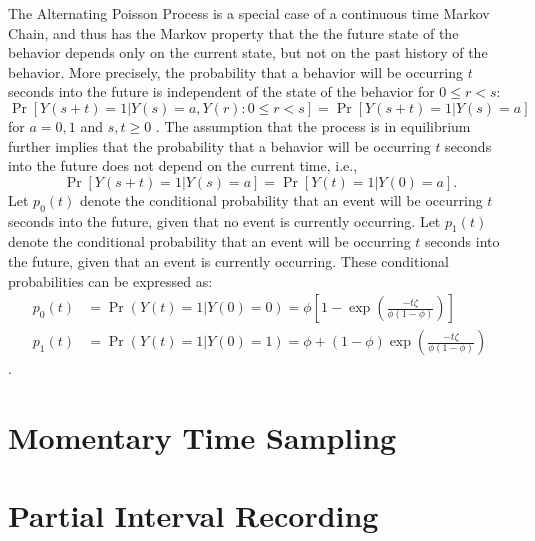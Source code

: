 \documentclass[man, noextraspace, floatsintext]{apa6}\usepackage[]{graphicx}\usepackage[]{color}
\begin{document}
The Alternating Poisson Process is a special case of a continuous time Markov Chain, and thus has the Markov property that the the future state of the behavior depends only on the current state, but not on the past history of the behavior. More precisely, the probability that a behavior will be occurring $t$ seconds into the future is independent of the state of the behavior for $0 \leq r < s$: 
\begin{equation}
\label{eq:Markov}
\Pr\left[Y(s + t) = 1 \left| Y(s) = a, Y(r): 0 \leq r < s \right.\right] = \Pr\left[ Y(s + t) = 1 \left| Y(s) = a \right.\right]
\end{equation}
for $a = 0,1$ and $s,t \geq 0$ \citep[Thm. 6.1]{Kulkarni2010modeling}. The assumption that the process is in equilibrium further implies that the probability that a behavior will be occurring $t$ seconds into the future does not depend on the current time, i.e.,  
\begin{equation}
\label{eq:equilibrium}
\Pr\left[Y(s + t) = 1 \left| Y(s) = a\right.\right] = \Pr\left[ Y(t) = 1 \left| Y(0) = a \right.\right].
\end{equation}
Let $p_0(t)$ denote the conditional probability that an event will be occurring $t$ seconds into the future, given that no event is currently occurring. Let $p_1(t)$ denote the conditional probability that an event will be occurring $t$ seconds into the future, given that an event is currently occurring. These conditional probabilities can be expressed as:
\begin{equation}
\begin{aligned}
p_0(t) &= \Pr(Y(t) = 1 | Y(0) = 0) = \phi \left[1 - \exp\left(\frac{- t \zeta}{\phi (1 - \phi)}\right)\right] \\
p_1(t) &= \Pr(Y(t) = 1 | Y(0) = 1) = \phi + (1 - \phi) \exp\left(\frac{- t \zeta}{\phi (1 - \phi)}\right)
\end{aligned}
\end{equation}
\citep[Eq. 6.17]{Kulkarni2010modeling}.



\section{Momentary Time Sampling}
\label{sec:MTS}

\section{Partial Interval Recording}
\label{sec:PIR}
\end{document}
